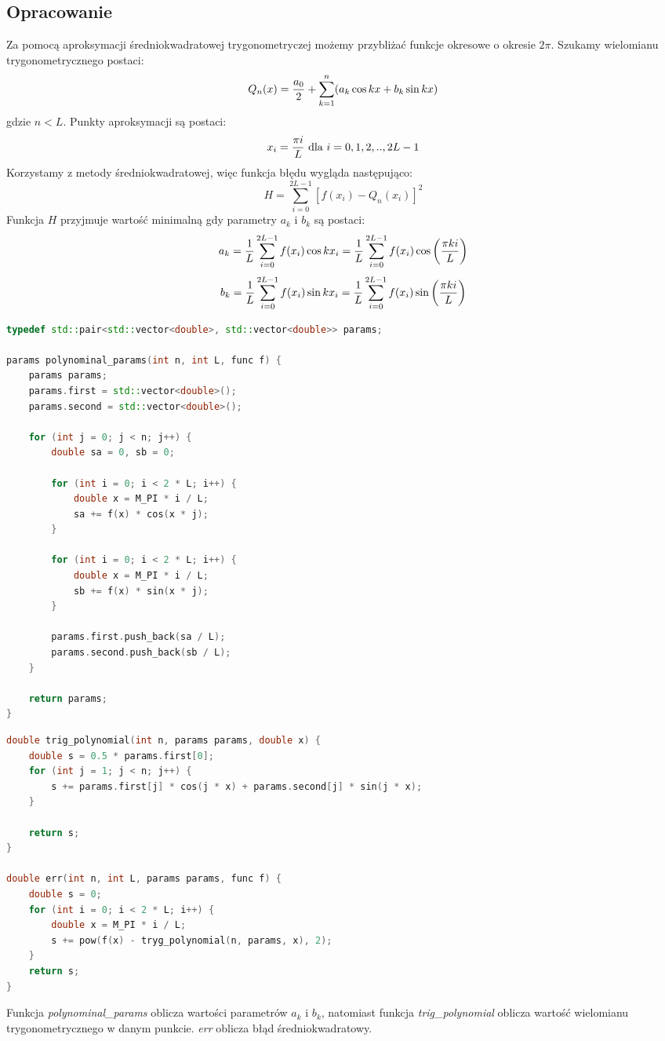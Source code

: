 \documentclass{article}
\begin{document}
\subsection{Opracowanie}

Za pomocą aproksymacji średniokwadratowej trygonometryczej możemy przybliżać funkcje okresowe o okresie \(2\pi\). Szukamy wielomianu trygonometrycznego postaci:
\[Q_n(x)={{a_0}\over{2}}+\sum_{k=1}^n(a_k\cos kx+b_k\sin kx)\]
gdzie \(n < L\). Punkty aproksymacji są postaci:
\[x_i={{\pi i}\over{L}}\mbox{ dla }i=0,1,2,..,2L-1\]
Korzystamy z metody średniokwadratowej, więc funkcja błędu wygląda następująco:
\[H=\sum_{i=0}^{2L-1}\left[f(x_i)-Q_n(x_i)\right]^2\]
Funkcja \(H\) przyjmuje wartość minimalną gdy parametry \(a_k\) i \(b_k\) są postaci:
\[a_k={{1}\over{L}}\sum_{i=0}^{2L-1}f(x_i)\cos k x_i={{1}\over{L}}\sum_{i=0}^{2L-1}f(x_i)\cos\left({{\pi ki}\over{L}}\right)\]
\[b_k={{1}\over{L}}\sum_{i=0}^{2L-1}f(x_i)\sin kx_i={{1}\over{L}}\sum_{i=0}^{2L-1}f(x_i)\sin\left({{\pi ki}\over{L}}\right)\]

\clearpage

\begin{lstlisting}[language=C++]
typedef std::pair<std::vector<double>, std::vector<double>> params;

params polynominal_params(int n, int L, func f) {
    params params;
    params.first = std::vector<double>();
    params.second = std::vector<double>();

    for (int j = 0; j < n; j++) {
        double sa = 0, sb = 0;

        for (int i = 0; i < 2 * L; i++) {
            double x = M_PI * i / L;
            sa += f(x) * cos(x * j);
        }

        for (int i = 0; i < 2 * L; i++) {
            double x = M_PI * i / L;
            sb += f(x) * sin(x * j);
        }

        params.first.push_back(sa / L);
        params.second.push_back(sb / L);
    }

    return params;
}
\end{lstlisting}

\begin{lstlisting}[language=C++]
double trig_polynomial(int n, params params, double x) {
    double s = 0.5 * params.first[0];
    for (int j = 1; j < n; j++) {
        s += params.first[j] * cos(j * x) + params.second[j] * sin(j * x);
    }

    return s;
}

double err(int n, int L, params params, func f) {
    double s = 0;
    for (int i = 0; i < 2 * L; i++) {
        double x = M_PI * i / L;
        s += pow(f(x) - tryg_polynomial(n, params, x), 2);
    }
    return s;
}
\end{lstlisting}
Funkcja \emph{polynominal\_params} oblicza wartości parametrów \(a_k\) i \(b_k\), natomiast funkcja \emph{trig\_polynomial} oblicza wartość wielomianu trygonometrycznego w danym punkcie. \emph{err} oblicza błąd średniokwadratowy.
\end{document}
